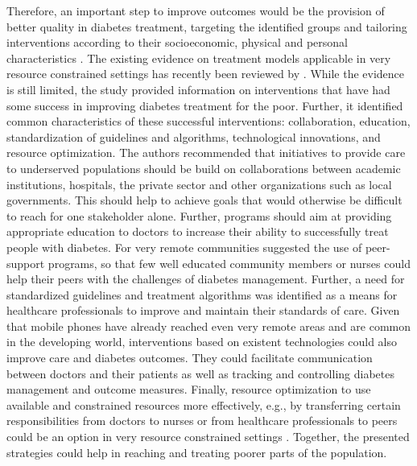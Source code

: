 Therefore, an important step to improve outcomes would be the provision of better quality in diabetes treatment, targeting the identified groups and tailoring interventions according to their socioeconomic, physical and personal characteristics \parencite{Cefalu2016}. The existing evidence on treatment models applicable in very resource constrained settings has recently been reviewed by \textcite{Esterson2014}. While the evidence is still limited, the study provided information on interventions that have had some success in improving diabetes treatment for the poor. Further, it identified common characteristics of these successful interventions: collaboration, education, standardization of guidelines and algorithms, technological innovations, and resource optimization. The authors recommended that initiatives to provide care to underserved populations should be build on collaborations between academic institutions, hospitals, the private sector and other organizations such as local governments. This should help to achieve goals that would otherwise be difficult to reach for one stakeholder alone. Further, programs should aim at providing appropriate education to doctors to increase their ability to successfully treat people with diabetes. For very remote communities \textcite{Esterson2014} suggested the use of peer-support programs, so that few well educated community members or nurses could help their peers with the challenges of diabetes management. Further, a need for standardized guidelines and treatment algorithms was identified as a means for healthcare professionals to improve and maintain their standards of care. Given that mobile phones have already reached even very remote areas and are common in the developing world, interventions based on existent technologies could also improve care and diabetes outcomes. They could facilitate communication between doctors and their patients as well as tracking and controlling diabetes management and outcome measures. Finally, resource optimization to use available and constrained resources more effectively, e.g., by transferring certain responsibilities from doctors to nurses or from healthcare professionals to peers could be an option in very resource constrained settings \parencite{Esterson2014}. Together, the presented strategies could help in reaching and treating poorer parts of the population.

